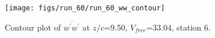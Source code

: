\begin{figure}[H]
\centering
\texttt{[image: figs/run\_60/run\_60\_ww\_contour]}
\caption{Contour plot of $\overline{w^\prime w^\prime}$ at $z/c$=9.50, $V_{free}$=33.04, station 6.}
\end{figure}


